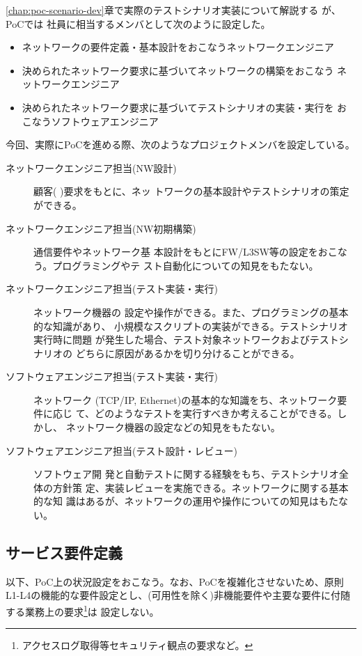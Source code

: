\ref{chap:poc-scenario-dev}章で実際のテストシナリオ実装について解説する
が、PoCでは \tj 社員に相当するメンバとして次のように設定した。
\begin{itemize}
 \item ネットワークの要件定義・基本設計をおこなうネットワークエンジニア
 \item 決められたネットワーク要求に基づいてネットワークの構築をおこなう
       ネットワークエンジニア
 \item 決められたネットワーク要求に基づいてテストシナリオの実装・実行を
       おこなうソフトウェアエンジニア
\end{itemize}

今回、実際にPoCを進める際、次のようなプロジェクトメンバを設定している。
\begin{description}
 \item[ネットワークエンジニア担当(NW設計)] 顧客( \yo )要求をもとに、ネッ
            トワークの基本設計やテストシナリオの策定ができる。
 \item[ネットワークエンジニア担当(NW初期構築)] 通信要件やネットワーク基
            本設計をもとにFW/L3SW等の設定をおこなう。プログラミングやテ
            スト自動化についての知見をもたない。
 \item[ネットワークエンジニア担当(テスト実装・実行)] ネットワーク機器の
            設定や操作ができる。また、プログラミングの基本的な知識があり、
            小規模なスクリプトの実装ができる。テストシナリオ実行時に問題
            が発生した場合、テスト対象ネットワークおよびテストシナリオの
            どちらに原因があるかを切り分けることができる。
 \item[ソフトウェアエンジニア担当(テスト実装・実行)] ネットワーク
            (TCP/IP, Ethernet)の基本的な知識をち、ネットワーク要件に応じ
            て、どのようなテストを実行すべきか考えることができる。しかし、
            ネットワーク機器の設定などの知見をもたない。
 \item[ソフトウェアエンジニア担当(テスト設計・レビュー)] ソフトウェア開
            発と自動テストに関する経験をもち、テストシナリオ全体の方針策
            定、実装レビューを実施できる。ネットワークに関する基本的な知
            識はあるが、ネットワークの運用や操作についての知見はもたない。
\end{description}

  \subsection{サービス要件定義}

以下、PoC上の状況設定をおこなう。なお、PoCを複雑化させないため、原則
L1-L4の機能的な要件設定とし、(可用性を除く)非機能要件や主要な要件に付随
する業務上の要求\footnote{アクセスログ取得等セキュリティ観点の要求など。}は
設定しない。

